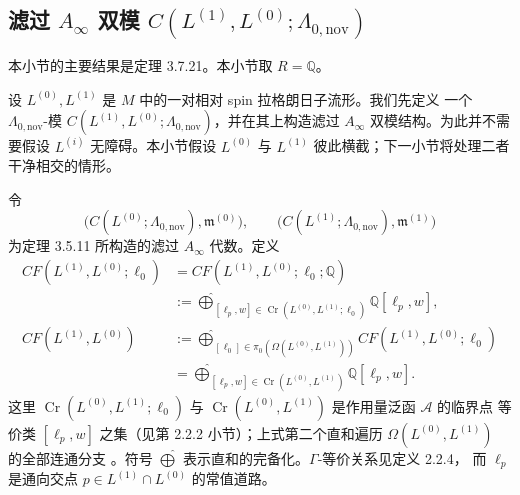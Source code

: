 
\subsection{滤过 \texorpdfstring{$A_\infty$}{A-infinity} 双模
\texorpdfstring{$C(L^{(1)},L^{(0)};\Lambda_{0,\mathrm{nov}})$}
{C(L1,L0;Lambda0nov)}}
\label{subsec:3-7-4}

本小节的主要结果是定理 3.7.21。本小节取 $R=\mathbb Q$。

设 $L^{(0)},L^{(1)}$ 是 $M$ 中的一对相对 spin 拉格朗日子流形。我们先定义
一个 $\Lambda_{0,\mathrm{nov}}$-模
$C(L^{(1)},L^{(0)};\Lambda_{0,\mathrm{nov}})$，并在其上构造滤过
$A_\infty$ 双模结构。为此并不需要假设 $L^{(i)}$ 无障碍。本小节假设
$L^{(0)}$ 与 $L^{(1)}$ 彼此横截；下一小节将处理二者干净相交的情形。

令
\[
  \bigl(C(L^{(0)};\Lambda_{0,\mathrm{nov}}),\mathfrak m^{(0)}\bigr),
  \qquad
  \bigl(C(L^{(1)};\Lambda_{0,\mathrm{nov}}),\mathfrak m^{(1)}\bigr)
\]
为定理 3.5.11 所构造的滤过 $A_\infty$ 代数。定义
\begin{align*}
 CF(L^{(1)},L^{(0)};\ell_0)
 &=CF(L^{(1)},L^{(0)};\ell_0;\mathbb Q)\\
 &:=\widehat{\bigoplus}_{
   [\ell_p,w]\in\operatorname{Cr}(L^{(0)},L^{(1)};\ell_0)}
   \mathbb Q[\ell_p,w],\\
 CF(L^{(1)},L^{(0)})
 &:=\widehat{\bigoplus}_{
   [\ell_0]\in\pi_0(\Omega(L^{(0)},L^{(1)}))}
   CF(L^{(1)},L^{(0)};\ell_0)\\
 &=\widehat{\bigoplus}_{
   [\ell_p,w]\in\operatorname{Cr}(L^{(0)},L^{(1)})}
   \mathbb Q[\ell_p,w].
\end{align*}
这里 $\operatorname{Cr}(L^{(0)},L^{(1)};\ell_0)$ 与
$\operatorname{Cr}(L^{(0)},L^{(1)})$ 是作用量泛函 $\mathcal A$ 的临界点
等价类 $[\ell_p,w]$ 之集（见第 2.2.2 小节）；上式第二个直和遍历
$\Omega(L^{(0)},L^{(1)})$ 的全部连通分支
。符号
$\widehat{\bigoplus}$ 表示直和的完备化。$\Gamma$-等价关系见定义 2.2.4，
而 $\ell_p$ 是通向交点 $p\in L^{(1)}\cap L^{(0)}$ 的常值道路。

